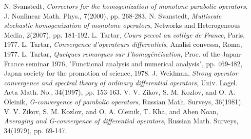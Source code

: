 \documentclass[11pt, epsf]{amsart}
\begin{document}
\begin{thebibliography}{References}
 N. Svanstedt, \emph{Correctors for the homogenization of monotone parabolic operators}, J. Nonlinear Math. Phys., 7(2000), pp. 268-283.
  N. Svanstedt, \emph{Multiscale stochastic homogenization of monotone operators}, Networks and Heterogeneous Media, 2(2007), pp. 181-192.
 L. Tartar, \emph{Cours peccot au coll\`{e}ge de France}, Paris, 1977.
 L. Tartar, \emph{Convergence d'operateurs differentiels}, Analisi convessa, Roma, 1977.
 L. Tartar, \emph{Quelques remarques sur I'homog\'{e}n\'{e}isation}, Proc. of the Japan-France seminar 1976, "Functional analysis and numerical analysis", pp. 469-482, Japan society for the promotion of science, 1978.
 J. Weidman, \emph{Strong operator convergence and spectral theory of ordinary differential operators}, Univ. Lagel. Acta Math. No., 34(1997), pp. 153-163.
 V. V. Zikov, S. M. Kozlov, and O. A. Oleinik, \emph{G-convergence of parabolic operators}, Russian Math. Surveys, 36(1981).
 V. V. Zikov, S. M. Kozlov, and O. A. Oleinik, T. Kha, and Aben Noan, \emph{Averaging and G-convergence of differential operators}, Russian Math. Surveys, 34(1979), pp. 69-147.
\end{thebibliography}
\end{document}
